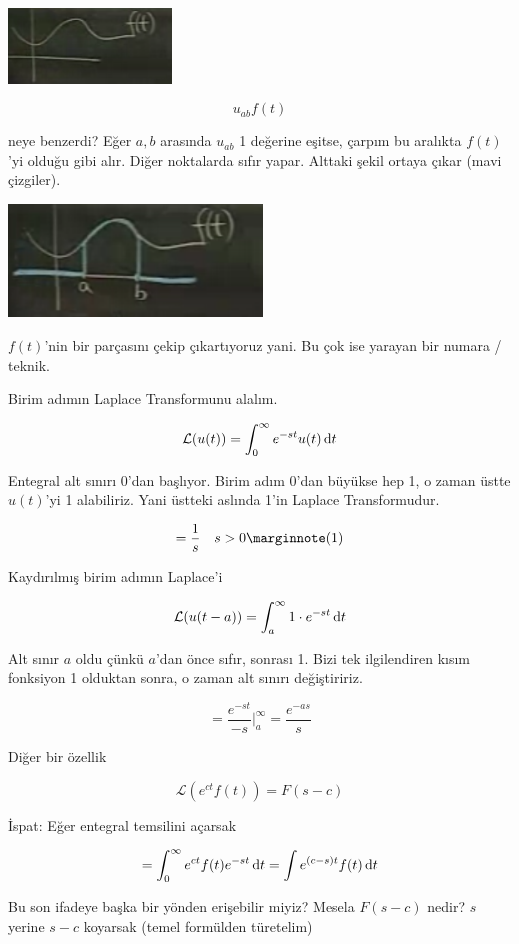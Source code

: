 \documentclass[12pt,fleqn]{article}\usepackage{../../common}
\begin{document}
\includegraphics[height=2cm]{22_4.png}

$$ u_{ab}f(t) $$

neye benzerdi? Eğer $a,b$ arasında $u_{ab}$ 1 değerine eşitse, çarpım bu
aralıkta $f(t)$'yi olduğu gibi alır. Diğer noktalarda sıfır yapar. Alttaki
şekil ortaya çıkar (mavi çizgiler). 

\includegraphics[height=3cm]{22_5.png}

$f(t)$'nin bir parçasını çekip çıkartıyoruz yani. Bu çok ise yarayan bir
numara / teknik. 

Birim adımın Laplace Transformunu alalım.

$$ \mathcal{L}(u(t)) = \int_{0}^{\infty} e^{-st} u(t) \,\mathrm{d} t  $$

Entegral alt sınırı 0'dan başlıyor. Birim adım 0'dan büyükse hep 1, o zaman
üstte $u(t)$'yi 1 alabiliriz. Yani üstteki aslında 1'in Laplace
Transformudur. 

$$ = \frac{1}{s} \ \ \ s>0 
\mlabel{1}
$$

Kaydırılmış birim adımın Laplace'i

$$
\mathcal{L} (u(t-a)) = 
\int_{a}^{\infty} 1 \cdot e^{-st} \,\mathrm{d} t
$$

Alt sınır $a$ oldu çünkü $a$'dan önce sıfır, sonrası 1. Bizi tek
ilgilendiren kısım fonksiyon 1 olduktan sonra, o zaman alt sınırı 
değiştiririz. 

$$ = \frac{e^{-st}}{-s} \bigg|_{a}^{\infty} =
\frac{e^{-as}}{s}
$$

Diğer bir özellik

$$ \mathcal{L}(e^{ct}f(t)) = F(s-c) $$

İspat: Eğer entegral temsilini açarsak

$$
= \int _{0}^{\infty} e^{ct}f(t)e^{-st} \,\mathrm{d} t  = \int e^{(c-s)t} f(t) \,\mathrm{d} t
$$

Bu son ifadeye başka bir yönden erişebilir miyiz? Mesela $F(s-c)$ nedir? 
$s$ yerine $s-c$ koyarsak (temel formülden türetelim)
\end{document}
